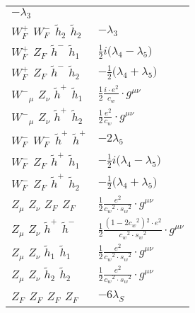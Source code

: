 \begin{center}
\begin{tabular}{|l|l|}
	$- \lambda_3$\\[2mm]
$W^+_F{}_{}$ \phantom{-} $W^-_F{}_{}$ \phantom{-} $\widetilde{h}_2{}_{}$ \phantom{-} $\widetilde{h}_2{}_{}$ \phantom{-}  &
	$- \lambda_3$\\[2mm]
$W^+_F{}_{}$ \phantom{-} $Z_F{}_{}$ \phantom{-} $\widetilde{h}^-{}_{}$ \phantom{-} $\widetilde{h}_1{}_{}$ \phantom{-}  &
	$\frac{1}{2} i\big( \lambda_4- \lambda_5\big)$\\[2mm]
$W^+_F{}_{}$ \phantom{-} $Z_F{}_{}$ \phantom{-} $\widetilde{h}^-{}_{}$ \phantom{-} $\widetilde{h}_2{}_{}$ \phantom{-}  &
	$-\frac{1}{2}\big( \lambda_4+ \lambda_5\big)$\\[2mm]
$W^-{}_{\mu }$ \phantom{-} ${Z}_{\nu }$ \phantom{-} $\widetilde{h}^+{}_{}$ \phantom{-} $\widetilde{h}_1{}_{}$ \phantom{-}  &
	$\frac{1}{2}\frac{ i \cdot e{}^2 }{ c_w}\cdot g^{\mu \nu} $\\[2mm]
$W^-{}_{\mu }$ \phantom{-} ${Z}_{\nu }$ \phantom{-} $\widetilde{h}^+{}_{}$ \phantom{-} $\widetilde{h}_2{}_{}$ \phantom{-}  &
	$\frac{1}{2}\frac{ e{}^2 }{ c_w}\cdot g^{\mu \nu} $\\[2mm]
$W^-_F{}_{}$ \phantom{-} $W^-_F{}_{}$ \phantom{-} $\widetilde{h}^+{}_{}$ \phantom{-} $\widetilde{h}^+{}_{}$ \phantom{-}  &
	$-2 \lambda_5$\\[2mm]
$W^-_F{}_{}$ \phantom{-} $Z_F{}_{}$ \phantom{-} $\widetilde{h}^+{}_{}$ \phantom{-} $\widetilde{h}_1{}_{}$ \phantom{-}  &
	$-\frac{1}{2} i\big( \lambda_4- \lambda_5\big)$\\[2mm]
$W^-_F{}_{}$ \phantom{-} $Z_F{}_{}$ \phantom{-} $\widetilde{h}^+{}_{}$ \phantom{-} $\widetilde{h}_2{}_{}$ \phantom{-}  &
	$-\frac{1}{2}\big( \lambda_4+ \lambda_5\big)$\\[2mm]
${Z}_{\mu }$ \phantom{-} ${Z}_{\nu }$ \phantom{-} $Z_F{}_{}$ \phantom{-} $Z_F{}_{}$ \phantom{-}  &
	$\frac{1}{2}\frac{ e{}^2 }{ c_w{}^2  \cdot s_w{}^2 }\cdot g^{\mu \nu} $\\[2mm]
${Z}_{\mu }$ \phantom{-} ${Z}_{\nu }$ \phantom{-} $\widetilde{h}^+{}_{}$ \phantom{-} $\widetilde{h}^-{}_{}$ \phantom{-}  &
	$\frac{1}{2}\frac{ (1-2 c_w {}^2){}^2  \cdot e{}^2 }{ c_w{}^2  \cdot s_w{}^2 }\cdot g^{\mu \nu} $\\[2mm]
${Z}_{\mu }$ \phantom{-} ${Z}_{\nu }$ \phantom{-} $\widetilde{h}_1{}_{}$ \phantom{-} $\widetilde{h}_1{}_{}$ \phantom{-}  &
	$\frac{1}{2}\frac{ e{}^2 }{ c_w{}^2  \cdot s_w{}^2 }\cdot g^{\mu \nu} $\\[2mm]
${Z}_{\mu }$ \phantom{-} ${Z}_{\nu }$ \phantom{-} $\widetilde{h}_2{}_{}$ \phantom{-} $\widetilde{h}_2{}_{}$ \phantom{-}  &
	$\frac{1}{2}\frac{ e{}^2 }{ c_w{}^2  \cdot s_w{}^2 }\cdot g^{\mu \nu} $\\[2mm]
$Z_F{}_{}$ \phantom{-} $Z_F{}_{}$ \phantom{-} $Z_F{}_{}$ \phantom{-} $Z_F{}_{}$ \phantom{-}  &
	$-6 \lambda_S$\\ \hline
\end{tabular}


\end{center}
